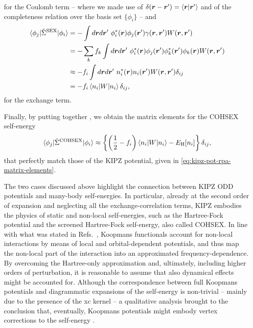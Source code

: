 %
for the Coulomb term -- where we made use of $\delta({\bm r}-{\bm r}')=\braket{{\bm r}|{\bm r}'}$ and of the completeness relation over the basis set $\{ \phi_i \}$ -- and
%
\begin{equation}
    \begin{split}
        \braket{\phi_j|\hat{\Sigma}^{\rm SEX}|\phi_i} &= - \int d{\bm r} d{\bm r}' \ \phi_i^*({\bm r}) \phi_j({\bm r}') \gamma({\bm r},{\bm r}') W({\bm r},{\bm r}') \\
        &= - \sum_k f_k \int d{\bm r} d{\bm r}' \ \phi_i^*({\bm r}) \phi_j({\bm r}') \phi_k^*({\bm r}') \phi_k({\bm r}) W({\bm r},{\bm r}') \\
        &\approx - f_i \int d{\bm r} d{\bm r}' \ n_i^*({\bm r}) n_i({\bm r}') W({\bm r},{\bm r}') \delta_{ij} \\
        &= - f_i \braket{n_i|W|n_i} \delta_{ij} ,
    \end{split}
    \label{eq:matrix-elements-sex-self-energy}
\end{equation}
%
for the exchange term.

Finally, by putting together , we obtain the matrix elements for the COHSEX self-energy
%
\begin{equation}
    \braket{\phi_j|\hat{\Sigma}^{\rm COHSEX}|\phi_i} \approx \left\{ \left( \frac{1}{2} - f_i \right) \braket{n_i|W|n_i} - E_{\rm H}[n_i] \right\} \delta_{ij},
\end{equation}
%
that perfectly match those of the KIPZ potential, given in \cref{eq:kipz-pot-rpa-matrix-elements}.

The two cases discussed above highlight the connection between KIPZ ODD potentials and many-body self-energies. In particular, already at the second order of expansion and neglecting all the exchange-correlation terms, KIPZ embodies the physics of static and non-local self-energies, such as the Hartree-Fock potential and the screened Hartree-Fock self-energy, also called COHSEX. In line with what was stated in Refs.~\cite{gatti_transforming_2007,ferretti_bridging_2014}, Koopmans functionals account for non-local interactions by means of local and orbital-dependent potentials, and thus map the non-local part of the interaction into an approximated frequency-dependence. By overcoming the Hartree-only approximation and, ultimately, including higher orders of perturbation, it is reasonable to assume that also dynamical effects might be accounted for. Although the correspondence between full Koopmans potentials and diagrammatic expansions of the self-energy is non-trivial -- mainly due to the presence of the xc kernel -- a qualitative analysis brought to the conclusion that, eventually, Koopmans potentials might embody vertex corrections to the \gw self-energy \cite{colonna_koopmans-compliant_2019}.

